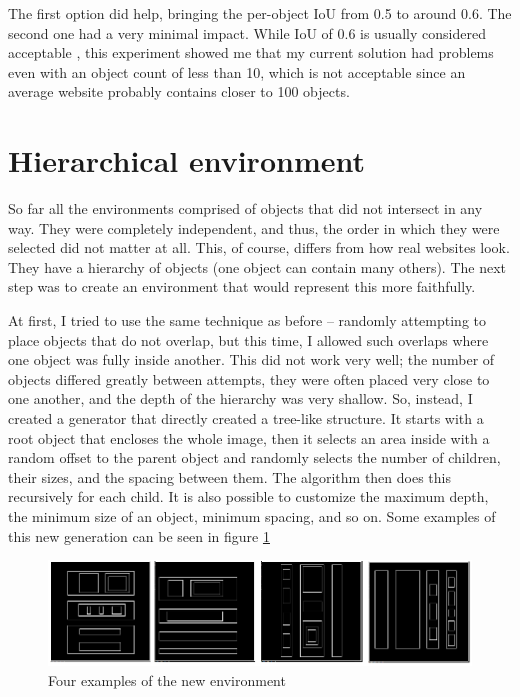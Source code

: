 \documentclass[
  digital,     %
  oneside,     %
  nosansbold,  %
  nocolorbold, %
  lof,         %
  lot,         %
]{fithesis4}
\begin{document}
The first option did help, bringing the per-object IoU from 0.5 to around 0.6. The second one had a very minimal impact. While IoU of 0.6 is usually considered acceptable \cite[p. 291]{DLforVisualSystems}, this experiment showed me that my current solution had problems even with an object count of less than 10, which is not acceptable since an average website probably contains closer to 100 objects.

\section{Hierarchical environment}
\label{sec:hierarchical-env}

So far all the environments comprised of objects that did not intersect in any way. They were completely independent, and thus, the order in which they were selected did not matter at all. This, of course, differs from how real websites look. They have a hierarchy of objects (one object can contain many others). The next step was to create an environment that would represent this more faithfully.

At first, I tried to use the same technique as before -- randomly attempting to place objects that do not overlap, but this time, I allowed such overlaps where one object was fully inside another. This did not work very well; the number of objects differed greatly between attempts, they were often placed very close to one another, and the depth of the hierarchy was very shallow. So, instead, I created a generator that directly created a tree-like structure. It starts with a root object that encloses the whole image, then it selects an area inside with a random offset to the parent object and randomly selects the number of children, their sizes, and the spacing between them. The algorithm then does this recursively for each child. It is also possible to customize the maximum depth, the minimum size of an object, minimum spacing, and so on. Some examples of this new generation can be seen in figure \ref{fig:env7}

\begin{figure}
    \centering
    \includegraphics[width=1\linewidth]{env_examples/env7.png}
    \caption{Four examples of the new environment}
    \label{fig:env7}
\end{figure}
\end{document}
